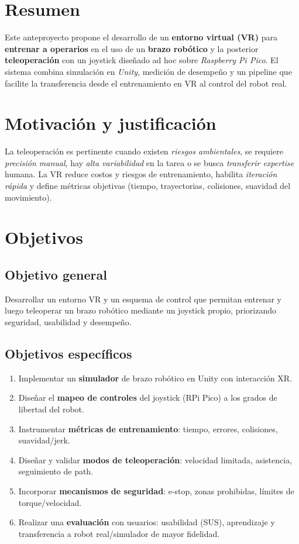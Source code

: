 \graphicspath{{Images/}}

\section{Resumen}
Este anteproyecto propone el desarrollo de un \textbf{entorno virtual (VR)} para \textbf{entrenar a operarios} en el uso de un \textbf{brazo robótico} y la posterior \textbf{teleoperación} con un joystick diseñado ad hoc sobre \textit{Raspberry Pi Pico}. El sistema combina simulación en \textit{Unity}, medición de desempeño y un pipeline que facilite la transferencia desde el entrenamiento en VR al control del robot real.

\section{Motivación y justificación}
La teleoperación es pertinente cuando existen \textit{riesgos ambientales}, se requiere \textit{precisión manual}, hay \textit{alta variabilidad} en la tarea o se busca \textit{transferir expertise} humana. La VR reduce costos y riesgos de entrenamiento, habilita \textit{iteración rápida} y define métricas objetivas (tiempo, trayectorias, colisiones, suavidad del movimiento).

\section{Objetivos}
\subsection{Objetivo general}
Desarrollar un entorno VR y un esquema de control que permitan entrenar y luego teleoperar un brazo robótico mediante un joystick propio, priorizando seguridad, usabilidad y desempeño.

\subsection{Objetivos específicos}
\begin{enumerate}
  \item Implementar un \textbf{simulador} de brazo robótico en Unity con interacción XR.
  \item Diseñar el \textbf{mapeo de controles} del joystick (RPi Pico) a los grados de libertad del robot.
  \item Instrumentar \textbf{métricas de entrenamiento}: tiempo, errores, colisiones, suavidad/jerk.
  \item Diseñar y validar \textbf{modos de teleoperación}: velocidad limitada, asistencia, seguimiento de path.
  \item Incorporar \textbf{mecanismos de seguridad}: e-stop, zonas prohibidas, límites de torque/velocidad.
  \item Realizar una \textbf{evaluación} con usuarios: usabilidad (SUS), aprendizaje y transferencia a robot real/simulador de mayor fidelidad.
\end{enumerate}

